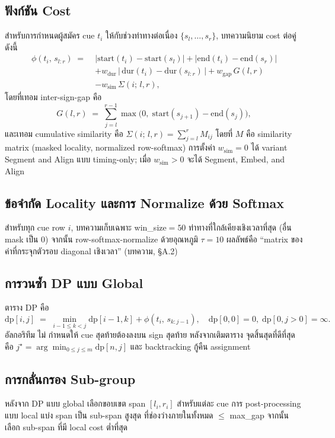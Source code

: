 \documentclass[11pt,a4paper]{article}
\def\texttt#1{#1}%
\def\emph#1{#1}%
\begin{document}
\subsection{ฟังก์ชัน Cost}
สำหรับการกำหนดผู้สมัคร cue $t_i$ ให้กับช่วงท่าทางต่อเนื่อง
$\{s_l, \ldots, s_r\}$, บทความนิยาม cost ต่อคู่ดังนี้
\begin{align}
\phi(t_i,\,s_{l:r}) \;=\;
& \bigl|\mathrm{start}(t_i) - \mathrm{start}(s_l)\bigr|
  + \bigl|\mathrm{end}(t_i)   - \mathrm{end}(s_r)\bigr| \nonumber\\
& + w_{\mathrm{dur}} \,\bigl|\,\mathrm{dur}(t_i) - \mathrm{dur}(s_{l:r})\,\bigr|
  + w_{\mathrm{gap}} \,G(l,r) \nonumber\\
& - w_{\mathrm{sim}} \,\Sigma(i;\,l,r),
\label{eq:cost}
\end{align}
โดยที่เทอม inter-sign-gap คือ
\[
G(l,r) \;=\;
\sum_{j=l}^{r-1} \max\bigl(0,\;\mathrm{start}(s_{j+1}) - \mathrm{end}(s_j)\bigr),
\]
และเทอม cumulative similarity คือ
$\Sigma(i;\,l,r) = \sum_{j=l}^{r} M_{ij}$
โดยที่ $M$ คือ similarity matrix (masked locality, normalized row-softmax)
การตั้งค่า $w_{\mathrm{sim}} = 0$ ได้ variant \emph{Segment and Align}
แบบ timing-only; เมื่อ $w_{\mathrm{sim}} > 0$ จะได้ \emph{Segment, Embed, and Align}

\subsection{ข้อจำกัด Locality และการ Normalize ด้วย Softmax}
สำหรับทุก cue row $i$, บทความเก็บเฉพาะ
\texttt{win\_size}${} = 50$ ท่าทางที่ใกล้เคียงเชิงเวลาที่สุด
(อื่น mask เป็น 0) จากนั้น row-softmax-normalize ด้วยอุณหภูมิ $\tau = 10$
ผลลัพธ์คือ ``matrix ของค่าที่กระจุกตัวรอบ diagonal เชิงเวลา'' (บทความ, \S A.2)

\subsection{การวนซ้ำ DP แบบ Global}
ตาราง DP คือ
\[
\mathrm{dp}[i,j] \;=\;
\min_{i-1 \le k < j} \mathrm{dp}[i-1, k] + \phi(t_i,\,s_{k:j-1}),
\quad \mathrm{dp}[0,0]=0,\; \mathrm{dp}[0,j>0]=\infty.
\]
อัลกอริทึม \emph{ไม่} กำหนดให้ cue สุดท้ายต้องลงบน sign สุดท้าย
หลังจากเติมตาราง จุดสิ้นสุดที่ดีที่สุดคือ
$j^\star = \arg\min_{0\le j \le m} \mathrm{dp}[n, j]$
และ backtracking กู้คืน assignment

\subsection{การกลั่นกรอง Sub-group}
หลังจาก DP แบบ global เลือกขอบเขต span $[l_i, r_i]$ สำหรับแต่ละ cue
การ post-processing แบบ local แบ่ง span เป็น sub-span สูงสุด
ที่ช่องว่างภายในทั้งหมด $\le$ \texttt{max\_gap} จากนั้นเลือก sub-span
ที่มี local cost ต่ำที่สุด
\end{document}
